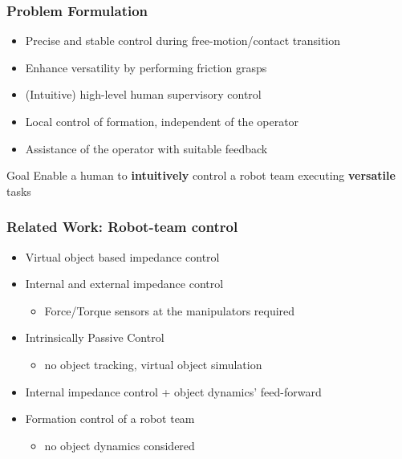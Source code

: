 \documentclass[student]{ITRslides}
\begin{document}
\begin{frame}
	\frametitle{Problem Formulation}

	\begin{itemize}
		\item Precise and stable control during free-motion/contact transition
		\item Enhance versatility by performing friction grasps
		\item (Intuitive) high-level human supervisory control
		\item Local control of formation, independent of the operator
		\item Assistance of the operator with suitable feedback
	\end{itemize}
	
	\begin{block}{Goal}
		Enable a human to \textbf{intuitively} control a robot team executing \textbf{versatile} tasks
	\end{block}	

\end{frame}

\begin{frame}
	\frametitle{Related Work: Robot-team control}
	\begin{itemize}
		\item Virtual object based impedance control \cite{Schneider_92}
				\item Internal and external impedance control \cite{Caccavale_01,Caccavale_08}
			\begin{itemize}
			\item Force/Torque sensors at the manipulators required
			\end{itemize}
	
		\item Intrinsically Passive Control \cite{Stramigioli_01, Wimboeck_08}
		\begin{itemize}
			\item no object tracking, virtual object simulation
		\end{itemize}
		\item Internal impedance control + object dynamics' feed-forward \cite{Erhart_15}
	\item Formation control of a robot team \cite{Sieber_15,Wimboeck_06}
		\begin{itemize}
			\item no object dynamics considered
		\end{itemize}
	\end{itemize}
\end{frame}
\end{document}
